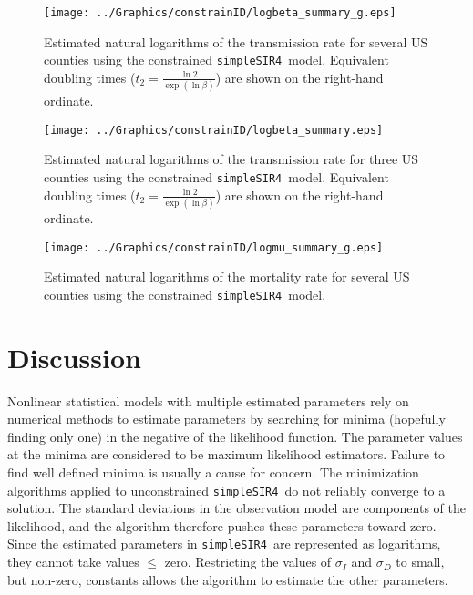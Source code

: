 \documentclass[12pt,letterpaper]{article}
\newcommand\SSm{{\tt simpleSIR4}}
\begin{document}
\begin{figure}
\begin{center}
\texttt{[image: ../Graphics/constrainID/logbeta\_summary\_g.eps]}\\
\end{center}
\caption{\label{fig:xrates}
Estimated natural logarithms of the transmission rate for several US
counties using the constrained \SSm\ model.
Equivalent doubling times ($t_2 = \frac{\ln 2}{\exp(\ln \beta)}$)
are shown on the right-hand ordinate.
}
\end{figure}

\begin{figure}
\begin{center}
\texttt{[image: ../Graphics/constrainID/logbeta\_summary.eps]}\\
\end{center}
\caption{\label{fig:xrates2}
Estimated natural logarithms of the transmission rate for three US
counties using the constrained \SSm\ model.
Equivalent doubling times ($t_2 = \frac{\ln 2}{\exp(\ln \beta)}$)
are shown on the right-hand ordinate.
}
\end{figure}

\begin{figure}
\begin{center}
\texttt{[image: ../Graphics/constrainID/logmu\_summary\_g.eps]}\\
\end{center}
\caption{\label{fig:drates}
Estimated natural logarithms of the mortality rate for several US counties using the
constrained \SSm\ model.
}
\end{figure}

\section*{Discussion}

Nonlinear statistical models with multiple estimated parameters rely
on numerical methods to estimate parameters by searching for minima
(hopefully finding only one) in the negative of the likelihood
function. The parameter values at the minima are considered to be
maximum likelihood estimators. Failure to find well defined minima is
usually a cause for concern. The minimization algorithms applied to
unconstrained \SSm\ do not reliably converge to a solution. The
standard deviations in the observation model are components of the
likelihood, and the algorithm therefore pushes these parameters toward zero.
Since the estimated parameters in \SSm\ are represented as logarithms,
they cannot take values $\le$ zero. Restricting the values of
$\sigma_I$ and $\sigma_D$ to small, but non-zero, constants allows the
algorithm to estimate the other parameters.
\end{document}
